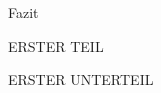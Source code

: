 \documentclass[pdftex, a4paper,11pt, twoside, ngerman]{report}
\begin{document}
  \begin{chapter}{Fazit}
    \label{chp:Fazit}
    
    
    
    \begin{section}{ERSTER TEIL}
      \label{chp:Fazit:sec:ERSTERTEIL}
      
      
      
      \begin{subsection}{ERSTER UNTERTEIL}
	\label{chp:Fazit:sec:ERSTERTEIL:subsec:UNTERTEIL}
       
       
       
      \end{subsection}
      
      
    \end{section}
    
  \end{chapter}
  
  
  
\end{document}
